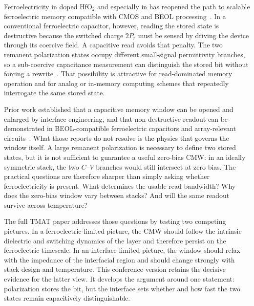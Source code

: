 Ferroelectricity in doped HfO$_2$ and especially in \hzo{} has reopened the path to scalable ferroelectric memory compatible with CMOS and BEOL processing~\cite{boscke2011,muller2012,schroeder2022}. In a conventional ferroelectric capacitor, however, reading the stored state is destructive because the switched charge $2P_r$ must be sensed by driving the device through its coercive field. A capacitive read avoids that penalty. The two remanent polarization states occupy different small-signal permittivity branches, so a sub-coercive capacitance measurement can distinguish the stored bit without forcing a rewrite~\cite{luo2020}. That possibility is attractive for read-dominated memory operation and for analog or in-memory computing schemes that repeatedly interrogate the same stored state.

Prior work established that a capacitive memory window can be opened and enlarged by interface engineering, and that non-destructive readout can be demonstrated in BEOL-compatible ferroelectric capacitors and array-relevant circuits~\cite{mukherjee2023iedm,lee2025aem}. What those reports do not resolve is the physics that governs the window itself. A large remanent polarization is necessary to define two stored states, but it is not sufficient to guarantee a useful zero-bias CMW: in an ideally symmetric stack, the two $C$--$V$ branches would still intersect at zero bias. The practical questions are therefore sharper than simply asking whether ferroelectricity is present. What determines the usable read bandwidth? Why does the zero-bias window vary between stacks? And will the same readout survive across temperature?

The full TMAT paper addresses those questions by testing two competing pictures. In a ferroelectric-limited picture, the CMW should follow the intrinsic dielectric and switching dynamics of the \hzo{} layer and therefore persist on the ferroelectric timescale. In an interface-limited picture, the window should relax with the impedance of the interfacial region and should change strongly with stack design and temperature. This conference version retains the decisive evidence for the latter view. It develops the argument around one statement: polarization stores the bit, but the interface sets whether and how fast the two states remain capacitively distinguishable.

